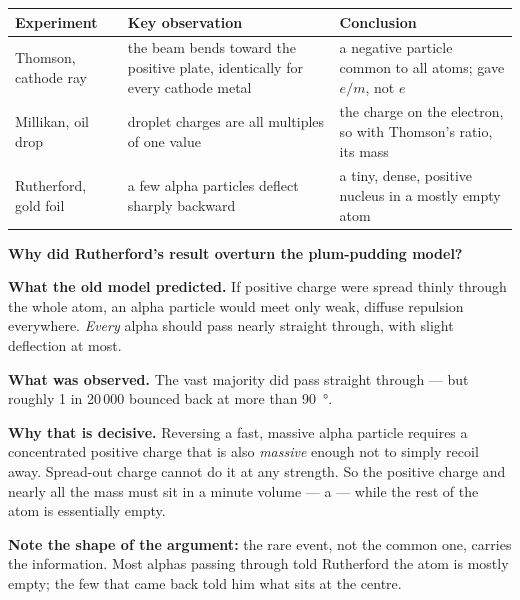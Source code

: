 \documentclass{apchem-worksheet}
\begin{document}
\begin{center}
\renewcommand{\arraystretch}{1.25}
\begin{tabular}{@{}p{2.9cm}p{4.6cm}p{5.6cm}@{}}
\hline
\textbf{Experiment} & \textbf{Key observation} & \textbf{Conclusion} \\
\hline
Thomson, cathode ray & the beam bends toward the positive plate,
  identically for every cathode metal &
  a negative particle common to all atoms; gave $e/m$, not $e$ \\
Millikan, oil drop & droplet charges are all multiples of one value &
  the charge on the electron, so with Thomson's ratio, its mass \\
Rutherford, gold foil & a few alpha particles deflect sharply backward &
  a tiny, dense, positive nucleus in a mostly empty atom \\
\hline
\end{tabular}
\end{center}

\begin{workedexample}
\textbf{Why did Rutherford's result overturn the plum-pudding model?}

\textbf{What the old model predicted.} If positive charge were spread
thinly through the whole atom, an alpha particle would meet only weak,
diffuse repulsion everywhere. \emph{Every} alpha should pass nearly
straight through, with slight deflection at most.

\textbf{What was observed.} The vast majority did pass straight through
--- but roughly 1 in 20\,000 bounced back at more than
\SI{90}{\degree}.

\textbf{Why that is decisive.} Reversing a fast, massive alpha particle
requires a concentrated positive charge that is also \emph{massive}
enough not to simply recoil away. Spread-out charge cannot do it at any
strength. So the positive charge and nearly all the mass must sit in a
minute volume --- a  --- while the rest of the atom is
essentially empty.

\textbf{Note the shape of the argument:} the rare event, not the common
one, carries the information. Most alphas passing through told
Rutherford the atom is mostly empty; the few that came back told him
what sits at the centre.
\end{workedexample}
\end{document}
